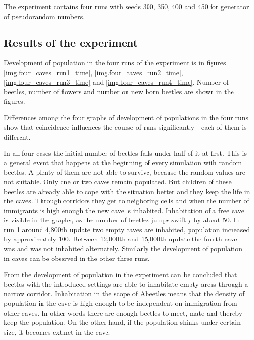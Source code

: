 \documentclass[a4paper,12pt]{report}
\begin{document}
The experiment contains four runs with seeds 300, 350, 400 and 450 for generator of pseudorandom numbers. 



\subsection{Results of the experiment}

Development of population in the four runs of the experiment is in figures \ref{img.four_caves_run1_time}, \ref{img.four_caves_run2_time}, \ref{img.four_caves_run3_time} and \ref{img.four_caves_run4_time}. Number of beetles, number of flowers and number on new born beetles are shown in the figures.
 
Differences among the four graphs of development of populations in the four runs show that coincidence influences the course of runs significantly - each of them is different.

In all four cases the initial number of beetles falls under half of it at first. This is a general event that happens at the beginning of every simulation with random beetles. A plenty of them are not able to survive, because the random values are not suitable. Only one or two caves remain populated. But children of these beetles are already able to cope with the situation better and they keep the life in the caves. Through corridors they get to neigboring cells and when the number of immigrants is high enough the new cave is inhabited. Inhabitation of a free cave is visible in the graphs, as the number of beetles jumps swiftly by about 50. In run 1 around 4,800th update two empty caves are inhabited, population increased by approximately 100. Between 12,000th and 15,000th update the fourth cave was and was not inhabited alternately. Similarly the development of population in caves can be observed in the other three runs.
 
From the development of population in the experiment can be concluded that beetles with the introduced settings are able to inhabitate empty areas through a narrow corridor. Inhabitation in the scope of Abeetles means that the density of population in the cave is high enough to be independent on immigration from other caves. In other words there are enough beetles to meet, mate and thereby keep the population. On the other hand, if the population shinks under certain size, it becomes extinct in the cave. 
\end{document}
